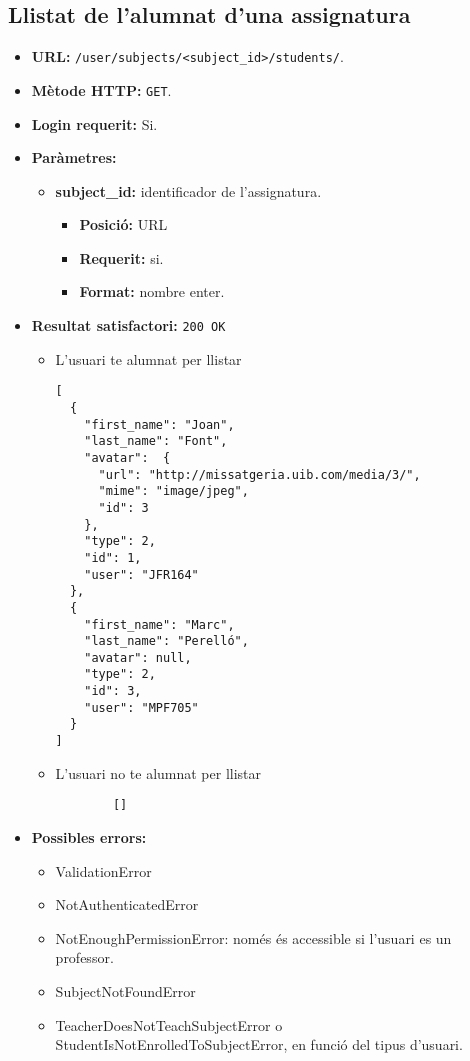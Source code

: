 \subsection{Llistat de l'alumnat d'una assignatura}
\begin{itemize}
\item \textbf{\ac{URL}: } \texttt{/user/subjects/<subject\_id>/students/}.
\item \textbf{Mètode \ac{HTTP}: } \texttt{GET}.
\item \textbf{Login requerit:} Si.
\item \textbf{Paràmetres:}
	\begin{itemize}
		\item \textbf{subject\_id:} identificador de l'assignatura.
		\begin{itemize}
			\item \textbf{Posició:} \ac{URL}
			\item \textbf{Requerit:} si.
			\item \textbf{Format:} nombre enter.
		\end{itemize}
	\end{itemize}
		
\item \textbf{Resultat satisfactori:} \texttt{200 OK}
	\begin{itemize}
		\item L'usuari te alumnat per llistar
		\begin{verbatim}
[
  {
    "first_name": "Joan",
    "last_name": "Font",
    "avatar":  {
      "url": "http://missatgeria.uib.com/media/3/",
      "mime": "image/jpeg",
      "id": 3
    },
    "type": 2,
    "id": 1,
    "user": "JFR164"
  },
  {
    "first_name": "Marc",
    "last_name": "Perelló",
    "avatar": null,
    "type": 2,
    "id": 3,
    "user": "MPF705"
  }
]
		\end{verbatim}
		\item L'usuari no te alumnat per llistar
		\begin{verbatim}
		[]
		\end{verbatim}
	\end{itemize}
\item \textbf{Possibles errors:}
	\begin{itemize}
		\item ValidationError
		\item NotAuthenticatedError
		\item NotEnoughPermissionError: només és accessible si l'usuari es un professor.
		\item SubjectNotFoundError
		\item TeacherDoesNotTeachSubjectError o StudentIsNotEnrolledToSubjectError, en funció del tipus d'usuari.
	\end{itemize}
\end{itemize}

